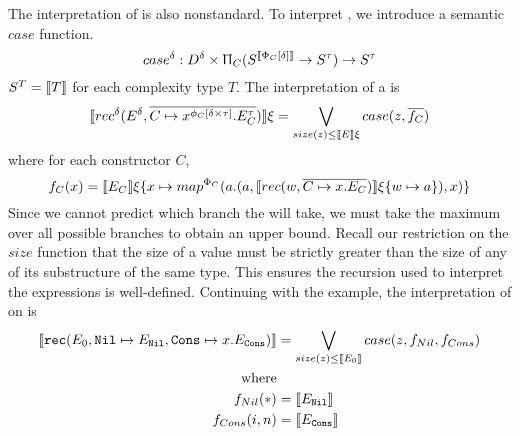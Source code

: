 The interpretation of  is also nonstandard. To interpret , we
introduce a semantic $case$ function.
%
\[
  case^\delta : D^\delta \times \Uppi_{C} (S^{\llbracket \Phi_C[\delta]\rrbracket} \to S^\tau) \to S^\tau
\]
%
$S^T = \llbracket T \rrbracket$ for each complexity type $T$. The interpretation of a  is
%
\[
  \llbracket rec^\delta(E^\delta, \overline{C \mapsto x^{\phi_C[\delta \times \tau]}.E_C^\tau}) \rrbracket \xi = \bigvee\limits_{size(z) \leq \llbracket E \rrbracket \xi} case(z, \overline{f_C})
\]
%
where for each constructor $C$,
%
\[
  f_C(x) = \llbracket E_C \rrbracket \xi \{ x \mapsto map^{\Phi_C}(a.(a, \llbracket rec(w, \overline{C \mapsto x.E_C})\rrbracket \xi \{ w \mapsto a \}), x) \}
\]
%
Since we cannot predict which branch the  will take, we must take the
maximum over all possible branches to obtain an upper bound. Recall our
restriction on the $size$ function that the size of a value must be strictly
greater than the size of any of its substructure of the same type. This ensures
the recursion used to interpret the  expressions is well-defined.
Continuing with the  example, the interpretation of  on  is
%
\begin{align*}
  \llbracket\texttt{rec}(E_0, \texttt{Nil} \mapsto E_{\texttt{Nil}}, \texttt{Cons} \mapsto x.E_{\texttt{Cons}})\rrbracket &= \bigvee\limits_{size(z) \leq \llbracket E_0 \rrbracket} case(z, f_{Nil}, f_{Cons}) \\
  \text{where} \\
  f_{Nil}(\ast) &= \llbracket E_{\texttt{Nil}} \rrbracket \\
  f_{Cons}(i,n) &= \llbracket E_{\texttt{Cons}} \rrbracket
\end{align*}
